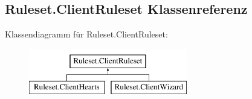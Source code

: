 \hypertarget{a00003}{\subsection{Ruleset.\-Client\-Ruleset Klassenreferenz}
\label{a00003}
}
Klassendiagramm für Ruleset.\-Client\-Ruleset\-:\begin{figure}[H]
\begin{center}
\leavevmode
\includegraphics[height=2.000000cm]{a00003}
\end{center}
\end{figure}
